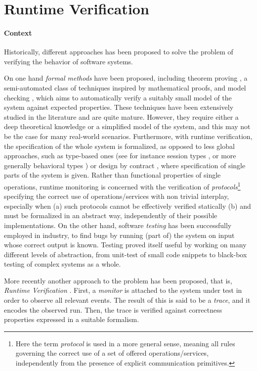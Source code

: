 \section{Runtime Verification}
\label{sec:rv}
\paragraph{Context}
Historically, different approaches has been proposed to solve the problem of verifying the behavior of software systems.

On one hand \emph{formal methods} have been proposed, including theorem proving \cite{itp}, a semi-automated class of techniques inspired by mathematical proofs, and model checking \cite{modelchecking}, which aims to automatically verify a suitably small model of the system against expected properties.
These techniques have been extensively studied in the literature and are quite mature.
However, they require either a deep theoretical knowledge or a simplified model of the system, and this may not be the case for many real-world scenarios.
Furthermore, with runtime verification, the specification of the whole system is formalized, as opposed to less global approaches, such as type-based ones (see for instance session types \cite{sessiontypes}, or more generally behavioral types \cite{AnconaBB0CDGGGH16}) or design by contract \cite{contracts}, where specification of single parts of the system is given. Rather than functional properties of single operations,
runtime monitoring is concerned with the verification of \emph{protocols}\footnote{Here the term \emph{protocol} is used in a more general sense, meaning all rules governing the correct use of a set of offered operations/services, independently from the presence of explicit communication primitives.} specifying the correct use of operations/services with non trivial interplay, especially when (a) such protocols cannot be effectively verified statically (b) and must be formalized in an abstract way, independently of their possible implementations.      
On the other hand, software \emph{testing} \cite{testing} has been successfully employed in industry, to find bugs by running (part of) the system on input whose correct output is known.
Testing proved itself useful by working on many different levels of abstraction, from unit-test of small code snippets to black-box testing of complex systems as a whole.

More recently another approach to the problem has been proposed, that is, \emph{Runtime Verification} \cite{rv}.
First, a \emph{monitor} is attached to the system under test in order to observe all relevant events.
The result of this is said to be a \emph{trace}, and it encodes the observed run.
Then, the trace is verified against correctness properties expressed in a suitable formalism.

